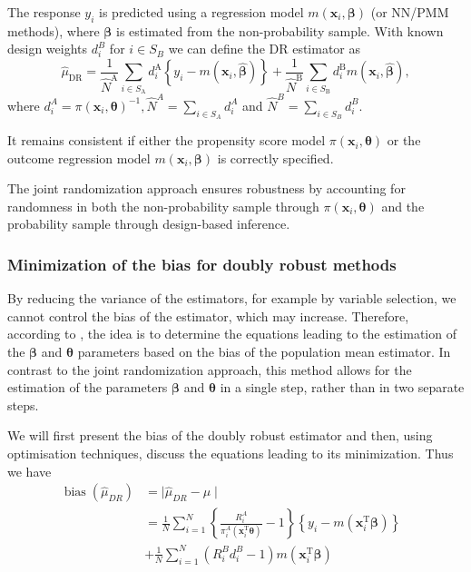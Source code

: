 \documentclass[
]{jss}
\begin{document}
The response \(y_i\) is predicted using a regression model
\(m(\boldsymbol{x}_i, \boldsymbol{\beta})\) (or NN/PMM methods), where
\(\boldsymbol{\beta}\) is estimated from the non-probability sample.
With known design weights \(d_i^B\) for \(i \in S_B\) we can define the
DR estimator as \begin{equation}
\label{dr}
\hat{\mu}_{\mathrm{DR}}=\frac{1}{\hat{N}^{\mathrm{A}}} \sum_{i \in S_{\mathrm{A}}} d_i^{\mathrm{A}}\left\{y_i-m\left(\boldsymbol{x}_i, \hat{\boldsymbol{\beta}}\right)\right\}+\frac{1}{\hat{N}^{\mathrm{B}}} \sum_{i \in S_{\mathrm{B}}} d_i^{\mathrm{B}} m\left(\boldsymbol{x}_i, \hat{\boldsymbol{\beta}}\right),
\end{equation} where
\(d_i^A=\pi\left(\boldsymbol{x}_i, \boldsymbol{\theta}\right)^{-1}, \hat{N}^A=\sum_{i \in S_A} d_i^A\)
and \(\hat{N}^B=\sum_{i \in S_B} d_i^B\).

It remains consistent if either the propensity score model
\(\pi(\boldsymbol{x}_i, \boldsymbol{\theta})\) or the outcome regression
model \(m(\boldsymbol{x}_i, \boldsymbol{\beta})\) is correctly
specified.

The joint randomization approach ensures robustness by accounting for
randomness in both the non-probability sample through
\(\pi(\boldsymbol{x}_i, \boldsymbol{\theta})\) and the probability
sample through design-based inference.

\hypertarget{minimization-of-the-bias-for-doubly-robust-methods}{%
\subsubsection{Minimization of the bias for doubly robust
methods}\label{minimization-of-the-bias-for-doubly-robust-methods}}

By reducing the variance of the estimators, for example by variable
selection, we cannot control the bias of the estimator, which may
increase. Therefore, according to \citet{yang_doubly_2020}, the idea is
to determine the equations leading to the estimation of the
\(\boldsymbol{\beta}\) and \(\boldsymbol{\theta}\) parameters based on
the bias of the population mean estimator. In contrast to the joint
randomization approach, this method allows for the estimation of the
parameters \(\boldsymbol{\beta}\) and \(\boldsymbol{\theta}\) in a
single step, rather than in two separate steps.

We will first present the bias of the doubly robust estimator and then,
using optimisation techniques, discuss the equations leading to its
minimization. Thus we have \begin{equation}
\begin{aligned}
\operatorname{bias}\left(\hat{\mu}_{D R}\right) & = \mid\hat{\mu}_{DR}-\mu\mid& \\
& =\frac{1}{N} \sum_{i=1}^N\left\{\frac{R_i^A}{\pi_i^A\left(\boldsymbol{x}_i^{\mathrm{T}} \boldsymbol{\theta}\right)}-1\right\}\left\{y_i-m\left(\boldsymbol{x}_i^{\mathrm{T}} \boldsymbol{\beta}\right)\right\}\\
& + \frac{1}{N} \sum_{i=1}^N\left(R_i^B d_i^B-1\right) m\left(\boldsymbol{x}_i^{\mathrm{T}} \boldsymbol{\beta}\right)
\end{aligned}
\end{equation}
\end{document}
